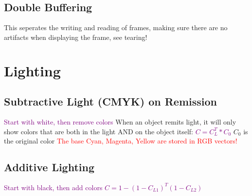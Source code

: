 \documentclass[main.tex,fontsize=12pt,paper=a4,paper=landscape,DIV=calc,]{scrartcl}
\begin{document}
\begin{multicols*}{4}
\subsection{Double Buffering}
This seperates the writing and reading of frames, making sure there are no artifacts when displaying the frame, see tearing!

\section{Lighting}
\subsection{Subtractive Light (CMYK) on Remission}
\textcolor{purple}{Start with white, then remove colors}\newline
When an object remits light, it will only show colors that are both in the light AND on the object itself:\newline
\textcolor{purple}{\(C = C_L^T * C_0\)}\newline
\(C_0\) is the original color\newline
\textcolor{red}{The base Cyan, Magenta, Yellow are stored in RGB vectors!}

\subsection{Additive Lighting}
\textcolor{purple}{Start with black, then add colors}\newline
\textcolor{purple}{\(C = 1 - (1 - C_{L1} )^T (1 - C_{L2} )\)}


\end{multicols*}
\end{document}
